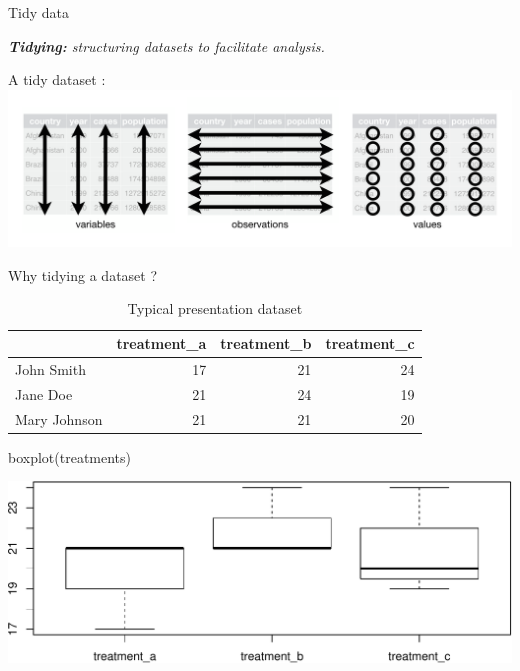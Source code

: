 \documentclass[14pt,ignorenonframetext,]{bredelebeamer}
\newenvironment{Shaded}{\begin{snugshade}}{\end{snugshade}}
\newcommand{\KeywordTok}[1]{\textcolor[rgb]{0.94,0.87,0.69}{#1}}
\newcommand{\NormalTok}[1]{\textcolor[rgb]{0.80,0.80,0.80}{#1}}
\begin{document}
\begin{frame}{Tidy data}

\begin{Large}
\textit{\textbf{Tidying:} structuring datasets to facilitate analysis.}
\end{Large}\begin{center}
A tidy dataset :\\
\includegraphics{images/tidy-1.png}

\end{center}

\end{frame}

\begin{frame}[fragile]{Why tidying a dataset ?}

\begin{center}
\begin{table}[t]

\caption{\label{tab:show1}Typical presentation dataset}
\centering
\begin{tabular}{l|r|r|r}
\hline
  & treatment\_a & treatment\_b & treatment\_c\\
\hline
John Smith & 17 & 21 & 24\\
\hline
Jane Doe & 21 & 24 & 19\\
\hline
Mary Johnson & 21 & 21 & 20\\
\hline
\end{tabular}
\end{table}
\end{center}

\begin{Shaded}
\begin{Highlighting}[]
\KeywordTok{boxplot}\NormalTok{(treatments)}
\end{Highlighting}
\end{Shaded}

\includegraphics{tidyverse_28_03_files/figure-beamer/boxplot1-1.pdf}

\end{frame}
\end{document}
